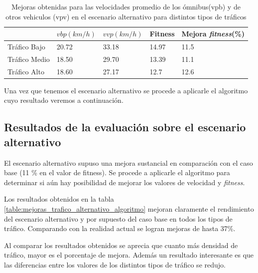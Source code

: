 \begin{table}[H]
	\renewcommand{\arraystretch}{1.2}
	\caption{Mejoras obtenidas para las velocidades promedio de los ómnibus(vpb) y de otros vehiculos (vpv) en el escenario alternativo para distintos tipos de tráficos }
	\label{table:mejoras_trafico_alternativo}
	\centering
	\begin{tabular}{p{3.5cm}p{2.5cm}p{2.5cm}p{2cm}p{2cm} }
		\hline
		&
		$vbp(km/h)$& 
		$vvp(km/h)$ & 
		Fitness &
		Mejora \emph{fitness}(\%)
		\\ 
		\hline

		Tráfico Bajo & 20.72  & 33.18 & 14.97 & 11.5\\
		Tráfico Medio & 18.50  & 29.70& 13.39 & 11.1 \\
		Tráfico Alto  & 18.60  & 27.17& 12.7 & 12.6\\		
		\hline
	\end{tabular}
\end{table}

Una vez que tenemos el escenario alternativo se procede a aplicarle el algoritmo cuyo resultado veremos a continuación.


\subsection{Resultados de la evaluación sobre el escenario alternativo}

El escenario alternativo supuso una mejora sustancial en comparación con el caso base (11 \% en el valor de fitness). Se procede a aplicarle el algoritmo para determinar si aún hay posibilidad de mejorar los valores de velocidad y \emph{fitness}.


Los resultados obtenidos en la tabla \ref{table:mejoras_trafico_alternativo_algoritmo}  mejoran claramente el rendimiento del escenario alternativo y por supuesto del caso base en todos los tipos de tráfico. Comparando con la realidad actual se logran mejoras de hasta 37\%. 

Al comparar los resultados obtenidos se aprecia que cuanto más densidad de tráfico, mayor es el porcentaje de mejora. Además un resultado interesante es que las diferencias entre los valores de los distintos tipos de tráfico se redujo.




